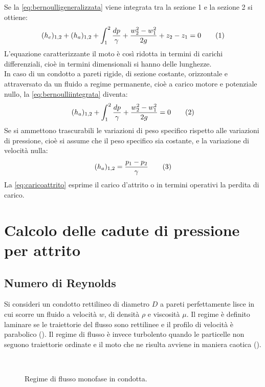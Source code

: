 Se la \eqref{eq:bernoulligeneralizzata} viene integrata tra la sezione 1 e la sezione 2 si ottiene:
\[(h_e)_{1,2}+(h_a)_{1,2}+\int^2_1{\frac{dp}{\gamma}}+\frac{w^2_2-w^2_1}{2g}+z_2-z_1=0\label{eq:bernoulliintegrata}\addtag\]
L'equazione caratterizzante il moto è così ridotta in termini di carichi differenziali, cioè in termini dimensionali si hanno delle lunghezze.\\
In caso di un condotto a pareti rigide, di sezione costante, orizzontale e attraversato da un fluido a regime permanente, cioè a carico motore e potenziale nullo, la \eqref{eq:bernoulliintegrata} diventa:
\[(h_a)_{1,2}+\int^2_1{\frac{dp}{\gamma}}+\frac{w^2_2-w^2_1}{2g}=0\label{eq:attritointermedio}\addtag\]
Se si ammettono trascurabili le variazioni di peso specifico rispetto alle variazioni di pressione, cioè si assume che il peso specifico sia costante, e la variazione di velocità nulla:
\[(h_a)_{1,2}=\frac{p_1-p_2}{\gamma}\label{eq:caricoattrito}\addtag\]
La \eqref{eq:caricoattrito} esprime il carico d'attrito o in termini operativi la perdita di carico. 
\section{Calcolo delle cadute di pressione per attrito}
\subsection{Numero di Reynolds}
Si consideri un condotto rettilineo di diametro \(D\) a pareti perfettamente lisce in cui scorre un fluido a velocità \(w\), di densità \(\rho\) e viscosità \(\mu\). Il regime è definito laminare se le traiettorie del flusso sono rettilinee e il profilo di velocità è parabolico (). Il regime di flusso è invece turbolento quando le particelle non seguono traiettorie ordinate e il moto che ne risulta avviene in maniera caotica ().

\begin{figure}[htbp]
\centering
     \qquad \qquad
     \\
\caption{Regime di flusso monofase in condotta.}
\label{fig:laminareturbolento}
\end{figure}

